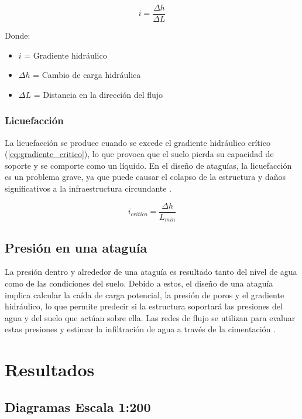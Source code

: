 \begin{equation}
    i = \frac{\Delta h}{\Delta L}
    \label{eq:gradiente_hidraulico}
\end{equation}

Donde:
\begin{itemize}
    \item $i$ = Gradiente hidráulico
    \item $\Delta h$ = Cambio de carga hidráulica
    \item $\Delta L$ = Distancia en la dirección del flujo
\end{itemize}

\subsubsection{Licuefacción}
La licuefacción se produce cuando se excede el gradiente hidráulico crítico (\ref{eq:gradiente_critico}), lo que provoca que el suelo pierda su capacidad de soporte y se comporte como un líquido. En el diseño de ataguías, la licuefacción es un problema grave, ya que puede causar el colapso de la estructura y daños significativos a la infraestructura circundante \citep{budhu_soil_2010}.

\begin{equation}
    i_{critico} = \frac{\Delta h}{L_{min}}
    \label{eq:gradiente_critico}
\end{equation}

\subsection{Presión en una ataguía}
La presión dentro y alrededor de una ataguía es resultado tanto del nivel de agua como de las condiciones del suelo. Debido a estos, el diseño de una ataguía implica calcular la caída de carga potencial, la presión de poros y el gradiente hidráulico, lo que permite predecir si la estructura soportará las presiones del agua y del suelo que actúan sobre ella. Las redes de flujo se utilizan para evaluar estas presiones y estimar la infiltración de agua a través de la cimentación \citep{sivakugan2005}.

\section{Resultados}

\subsection{Diagramas Escala 1:200}

